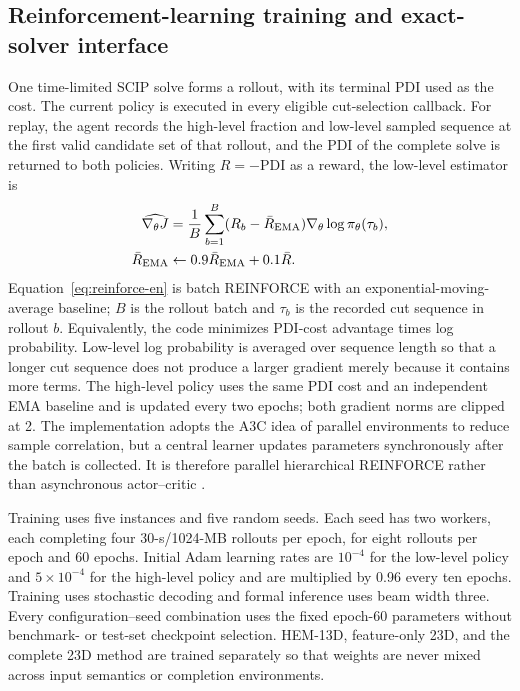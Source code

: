 \documentclass[final,5p,times,twocolumn]{elsarticle}
\newcommand{\pdi}{\mathrm{PDI}}
\begin{document}
\subsection{Reinforcement-learning training and exact-solver interface}

One time-limited SCIP solve forms a rollout, with its terminal PDI used as the cost. The current policy is executed in every eligible cut-selection callback. For replay, the agent records the high-level fraction and low-level sampled sequence at the first valid candidate set of that rollout, and the PDI of the complete solve is returned to both policies. Writing $R=-\pdi$ as a reward, the low-level estimator is
\begin{equation}
\begin{aligned}
\widehat{\nabla_\theta J}
&=\frac1B\sum_{b=1}^B(R_b-\bar R_{\rm EMA})
\nabla_\theta\log\pi_\theta(\tau_b),\\
\bar R_{\rm EMA}&\leftarrow0.9\bar R_{\rm EMA}+0.1\bar R.
\end{aligned}
\label{eq:reinforce-en}
\end{equation}
Equation~\eqref{eq:reinforce-en} is batch REINFORCE with an exponential-moving-average baseline; $B$ is the rollout batch and $\tau_b$ is the recorded cut sequence in rollout $b$. Equivalently, the code minimizes PDI-cost advantage times log probability. Low-level log probability is averaged over sequence length so that a longer cut sequence does not produce a larger gradient merely because it contains more terms. The high-level policy uses the same PDI cost and an independent EMA baseline and is updated every two epochs; both gradient norms are clipped at 2. The implementation adopts the A3C idea of parallel environments to reduce sample correlation, but a central learner updates parameters synchronously after the batch is collected. It is therefore parallel hierarchical REINFORCE rather than asynchronous actor--critic \citep{williams1992reinforce,mnih2016a3c}.

Training uses five instances and five random seeds. Each seed has two workers, each completing four 30-s/1024-MB rollouts per epoch, for eight rollouts per epoch and 60 epochs. Initial Adam learning rates are $10^{-4}$ for the low-level policy and $5\times10^{-4}$ for the high-level policy and are multiplied by 0.96 every ten epochs. Training uses stochastic decoding and formal inference uses beam width three. Every configuration--seed combination uses the fixed epoch-60 parameters without benchmark- or test-set checkpoint selection. HEM-13D, feature-only 23D, and the complete 23D method are trained separately so that weights are never mixed across input semantics or completion environments.
\end{document}
